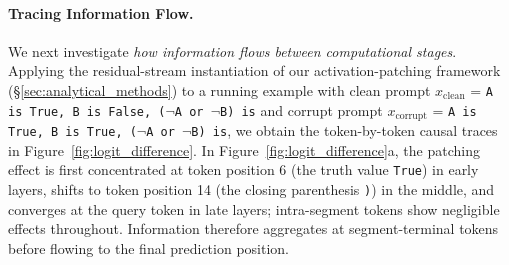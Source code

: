 \documentclass[11pt]{article}
\begin{document}
\paragraph{Tracing Information Flow.}
We next investigate \textit{how information flows between computational stages}. Applying the residual-stream instantiation of our activation-patching framework (§\ref{sec:analytical_methods}) to a running example with clean prompt $x_{\text{clean}}$ = \texttt{A is True, B is False, ($\neg$A or $\neg$B) is} and corrupt prompt $x_{\text{corrupt}}$ = \texttt{A is True, B is True, ($\neg$A or $\neg$B) is}, we obtain the token-by-token causal traces in Figure~\ref{fig:logit_difference}. In Figure~\ref{fig:logit_difference}a, the patching effect is first concentrated at token position 6 (the truth value \texttt{True}) in early layers, shifts to token position 14 (the closing parenthesis \texttt{)}) in the middle, and converges at the query token in late layers; intra-segment tokens show negligible effects throughout. Information therefore aggregates at segment-terminal tokens before flowing to the final prediction position.
\end{document}
